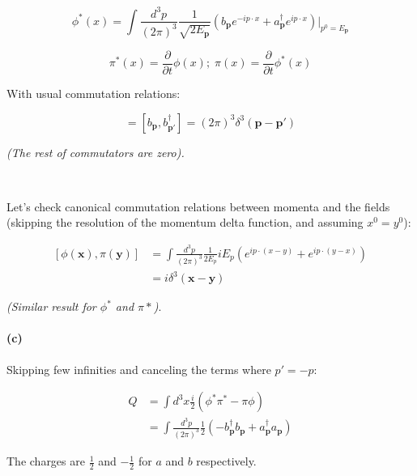 \documentclass[11pt]{article}
\begin{document}
\begin{equation}
\phi^*(x) = \int \frac{d^3p}{(2 \pi)^3}
  \frac{1}{ \sqrt{ 2 E_\mathbf{p} } }
  \left( b_\mathbf{p} e^{-i p \cdot x} +
         a^\dagger_\mathbf{p} e^{i p \cdot x}
         \right) \bigg\rvert_{p^0 = E_\mathbf{p}}
\end{equation}

\begin{equation}
\pi^*(x) = \frac{\partial}{\partial{t}} \phi(x) ; \;
\pi(x) = \frac{\partial}{\partial{t}} \phi^*(x)
\end{equation}

With usual commutation relations:

\begin{equation}
[ a_\mathbf{p}, a^\dagger_\mathbf{p'} ] =
  [ b_\mathbf{p}, b^\dagger_\mathbf{p'} ] =
  (2 \pi)^3 \delta^3(\mathbf{p} - \mathbf{p}')
\end{equation}

\textit{(The rest of commutators are zero).}

\

Let's check canonical commutation relations between momenta and
the fields (skipping the resolution of the momentum delta function,
and assuming $x^0 = y^0$):

\begin{equation}
\begin{split}
[ \phi(\mathbf{x}), \pi(\mathbf{y}) ] &
  = \int \frac{d^3p}{(2\pi)^3}
    \frac{1}{2 E_p} i E_p \left(
    e^{ip \cdot (x - y)} + e^{ip \cdot (y - x)} \right) \\
  & = i \delta^3 (\mathbf{x} - \mathbf{y})
\end{split}
\end{equation}

\textit{(Similar result for $\phi^*$ and $\pi*$)}.

\paragraph*{(c)} Skipping few infinities and canceling the terms
where $p' = -p$:

\begin{equation}
\begin{split}
Q & = \int d^3x \frac{i}{2} \left( \phi^* \pi^* - \pi \phi \right) \\
  & = \int \frac{d^3p}{(2 \pi)^3}
    \frac{1}{2}
    \left(
    	-b^\dagger_\mathbf{p} b_\mathbf{p} +
    	a^\dagger_\mathbf{p} a_\mathbf{p}
    \right)
\end{split}
\end{equation}

The charges are $\frac{1}{2}$ and $-\frac{1}{2}$ for $a$ and $b$
respectively.
\end{document}
